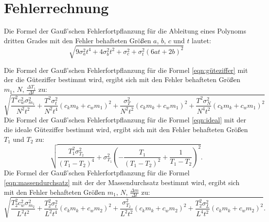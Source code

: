 \section{Fehlerrechnung}

Die Formel der Gauß'schen Fehlerfortpflanzung für die Ableitung eines Polynoms dritten Grades mit den Fehler behafteten Größen 
 $a$, $b$, $c$ und $t$ lautet:
\begin{equation}
\sqrt{9 \sigma_{a}^{2} t^{4} + 4 \sigma_{b}^{2} t^{2} + \sigma_{c}^{2} + \sigma_{t}^{2} \left(6 a t + 2 b\right)^{2}}
    \label{eqn:pol3}
\end{equation}

Die Formel der Gauß'schen Fehlerfortpflanzung für die Formel \ref{eqn:güteziffer} mit der die Güteziffer bestimmt wird, ergibt sich mit den Fehler behafteten Größen 
$m_1$, $N$, $\frac{\Delta T_1}{\Delta t}$ zu:
\begin{equation}
\sqrt{\frac{T^{2} c_{w}^{2} \sigma_{m_{1}}^{2}}{N^{2} t^{2}} + \frac{T^{2} \sigma_{t}^{2}}{N^{2} t^{4}} \left(c_{k} m_{k} + c_{w} m_{1}\right)^{2} + \frac{\sigma_{T}^{2}}{N^{2} t^{2}} \left(c_{k} m_{k} + c_{w} m_{1}\right)^{2} + \frac{T^{2} \sigma_{N}^{2}}{N^{4} t^{2}} \left(c_{k} m_{k} + c_{w} m_{1}\right)^{2}}
    \label{eq:gütefehler}
\end{equation}
Die Formel der Gauß'schen Fehlerfortpflanzung für die Formel \ref{eqn:ideal} mit der die ideale Güteziffer bestimmt wird, ergibt sich mit den Fehler behafteten Größen 
$T_1$ und $T_2$ zu:
\begin{equation}
\sqrt{\frac{T_{1}^{2} \sigma_{T_{2}}^{2}}{\left(T_{1} - T_{2}\right)^{4}} + \sigma_{T_{1}}^{2} \left(- \frac{T_{1}}{\left(T_{1} - T_{2}\right)^{2}} + \frac{1}{T_{1} - T_{2}}\right)^{2}}.
    \label{eq:idealFehler}
\end{equation}
Die Formel der Gauß'schen Fehlerfortpflanzung für die Formel \ref{eqn:massendurchsatz} mit der der Massendurchsatz bestimmt wird, ergibt sich mit den Fehler behafteten Größen 
$m_1$, $N$, $\frac{\Delta m}{\Delta t}$ zu:
\begin{equation}
\sqrt{\frac{T_{2}^{2} c_{w}^{2} \sigma_{m_{2}}^{2}}{L^{2} t^{2}} + \frac{T_{2}^{2} \sigma_{t}^{2}}{L^{2} t^{4}} \left(c_{k} m_{k} + c_{w} m_{2}\right)^{2} + \frac{\sigma_{T_{2}}^{2}}{L^{2} t^{2}} \left(c_{k} m_{k} + c_{w} m_{2}\right)^{2} + \frac{T_{2}^{2} \sigma_{L}^{2}}{L^{4} t^{2}} \left(c_{k} m_{k} + c_{w} m_{2}\right)^{2}}.
    \label{eq:massendurchsatzFehler}
\end{equation}

